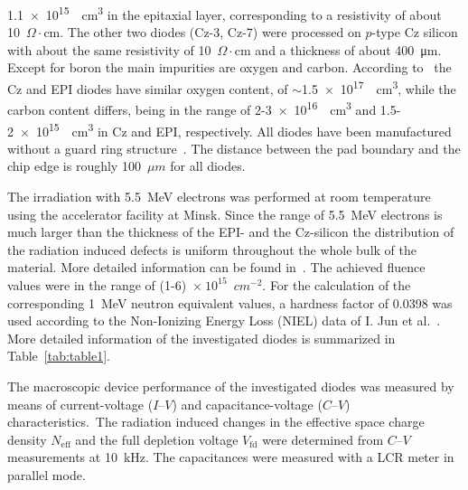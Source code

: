 \documentclass[final, 5p, times]{elsarticle}
\begin{document}
\SI{1.1e15}{\per\cubic\centi\meter} in the epitaxial layer, corresponding to a
resistivity of about 10~$\Omega\cdot$cm. The other two diodes (Cz-3, Cz-7) were
processed on $p$-type Cz silicon with about the same resistivity of
10~$\Omega\cdot$cm and a thickness of about \SI{400}{\micro\meter}. Except for boron the main impurities are oxygen and carbon. According to~\cite{b9} the Cz and EPI diodes have similar oxygen content, of $\sim$\SI{1.5e17}{\per\cubic\centi\meter}, while the carbon content differs, being in the range of 2-\SI{3e16}{\per\cubic\centi\meter} and 1.5-\SI{2e15}{\per\cubic\centi\meter} in Cz and EPI, respectively. All diodes have been manufactured without a guard ring structure~\cite{b12}. The distance between the pad boundary and the chip edge is roughly 100~$\si{\mu m}$ for all diodes.
\par
The irradiation with \SI{5.5}{\mega\electronvolt} electrons was performed at room temperature using the accelerator facility at Minsk. Since the range of 5.5~MeV electrons is much larger than the thickness of the EPI- and the Cz-silicon the distribution of the radiation induced defects is uniform throughout the whole bulk of the material. More detailed information can be found in~\cite{b13}. The achieved fluence values were in the range of (1-6)~$\times~10^{15}$~$\si{cm^{-2}}$. For the calculation of the corresponding \SI{1}{\mega\electronvolt} neutron equivalent values, a hardness factor of 0.0398 was used according to the Non-Ionizing Energy Loss (NIEL) data of I. Jun et al.~\cite{b14}. More detailed information of the investigated diodes is summarized in Table~\ref{tab:table1}.
\par
The macroscopic device performance of the investigated diodes was measured by means of current-voltage ($I$--$V$) and capacitance-voltage ($C$--$V$) characteristics.\ The radiation induced changes in the effective space charge density $N_\text{eff}$ and the full depletion voltage $V_\text{fd}$ were determined from $C$--$V$ measurements at \SI{10}{\kilo\hertz}. The capacitances were measured with a LCR meter in parallel mode.
\par
\end{document}
